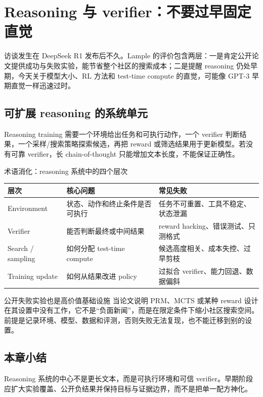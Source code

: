 \section{Reasoning 与 verifier：不要过早固定直觉}

访谈发生在 DeepSeek R1 发布后不久。Lample 的评价包含两层：一是肯定公开论文提供成功与失败实验，能节省整个社区的搜索成本；二是提醒 reasoning 仍处早期，今天关于模型大小、RL 方法和 test-time compute 的直觉，可能像 GPT-3 早期直觉一样迅速过时。

\subsection{可扩展 reasoning 的系统单元}

Reasoning training 需要一个环境给出任务和可执行动作，一个 verifier 判断结果，一个采样/搜索策略探索候选，再把 reward 或筛选结果用于更新模型。若没有可靠 verifier，长 chain-of-thought 只能增加文本长度，不能保证正确性。


\begin{knowledgebox}{术语消化：reasoning 系统中的四个层次}
\begin{tabularx}{\textwidth}{L{0.18\textwidth}X X}
\toprule
层次 & 核心问题 & 常见失败 \\
\midrule
Environment & 状态、动作和终止条件是否可执行 & 任务不可重置、工具不稳定、状态泄漏 \\
Verifier & 能否判断最终或中间结果 & reward hacking、错误测试、只测格式 \\
Search / sampling & 如何分配 test-time compute & 候选高度相关、成本失控、过早剪枝 \\
Training update & 如何从结果改进 policy & 过拟合 verifier、能力回退、数据偏斜 \\
\bottomrule
\end{tabularx}
\end{knowledgebox}

\begin{warningbox}{公开失败实验也是高价值基础设施}
当论文说明 PRM、MCTS 或某种 reward 设计在其设置中没有工作，它不是“负面新闻”，而是在限定条件下缩小社区搜索空间。前提是记录环境、模型、数据和评测，否则失败无法复现，也不能迁移到别的设置。
\end{warningbox}


\subsection{本章小结}

Reasoning 系统的中心不是更长文本，而是可执行环境和可信 verifier。早期阶段应扩大实验覆盖、公开负结果并保持目标与证据边界，而不是把单一配方神化。

